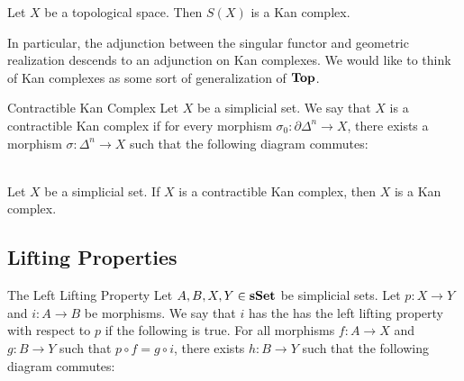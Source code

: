 \documentclass[a4paper]{article}
\begin{document}
\begin{lmm}{}{} Let $X$ be a topological space. Then $S(X)$ is a Kan complex. 
\end{lmm}

In particular, the adjunction between the singular functor and geometric realization descends to an adjunction on Kan complexes. We would like to think of Kan complexes as some sort of generalization of $\bold{Top}$. 

\begin{defn}{Contractible Kan Complex}{} Let $X$ be a simplicial set. We say that $X$ is a contractible Kan complex if for every morphism $\sigma_0:\partial\Delta^n\to X$, there exists a morphism $\sigma:\Delta^n\to X$ such that the following diagram commutes: \\~\\
\end{defn}

\begin{lmm}{}{} Let $X$ be a simplicial set. If $X$ is a contractible Kan complex, then $X$ is a Kan complex. 
\end{lmm}

\subsection{Lifting Properties}
\begin{defn}{The Left Lifting Property}{} Let $A,B,X,Y\in\bold{sSet}$ be simplicial sets. Let $p:X\to Y$ and $i:A\to B$ be morphisms. We say that $i$ has the has the left lifting property with respect to $p$ if the following is true. For all morphisms $f:A\to X$ and $g:B\to Y$ such that $p\circ f=g\circ i$, there exists $h:B\to Y$ such that the following diagram commutes: \\~\\
\\~\\
\end{defn}
\end{document}
